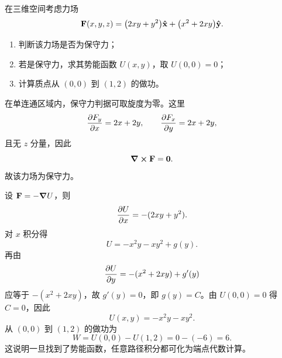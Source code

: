 \begin{university}
在三维空间考虑力场
\[
\vb{F}(x,y,z)=\qty(2xy+y^2)\vu{x}+\qty(x^2+2xy)\vu{y}.
\]
\begin{enumerate}
  \item 判断该力场是否为保守力；
  \item 若是保守力，求其势能函数 $U(x,y)$，取 $U(0,0)=0$；
  \item 计算质点从 $(0,0)$ 到 $(1,2)$ 的做功。
\end{enumerate}
\begin{solution}
在单连通区域内，保守力判据可取旋度为零。这里
\[
\pdv{F_y}{x}=2x+2y,
\qquad
\pdv{F_x}{y}=2x+2y,
\]
且无 $z$ 分量，因此
\[
\curl \vb{F}=\vb{0}.
\]
故该力场为保守力。

设 $\vb{F}=-\grad U$，则
\[
\pdv{U}{x}=-(2xy+y^2).
\]
对 $x$ 积分得
\[
U=-x^2y-xy^2+g(y).
\]
再由
\[
\pdv{U}{y}=-(x^2+2xy)+g'(y)
\]
应等于 $-(x^2+2xy)$，故 $g'(y)=0$，即 $g(y)=C$。由 $U(0,0)=0$ 得 $C=0$，因此
\[
U(x,y)=-x^2y-xy^2.
\]
从 $(0,0)$ 到 $(1,2)$ 的做功为
\[
W=U(0,0)-U(1,2)=0-(-6)=6.
\]
这说明一旦找到了势能函数，任意路径积分都可化为端点代数计算。
\end{solution}
\end{university}

